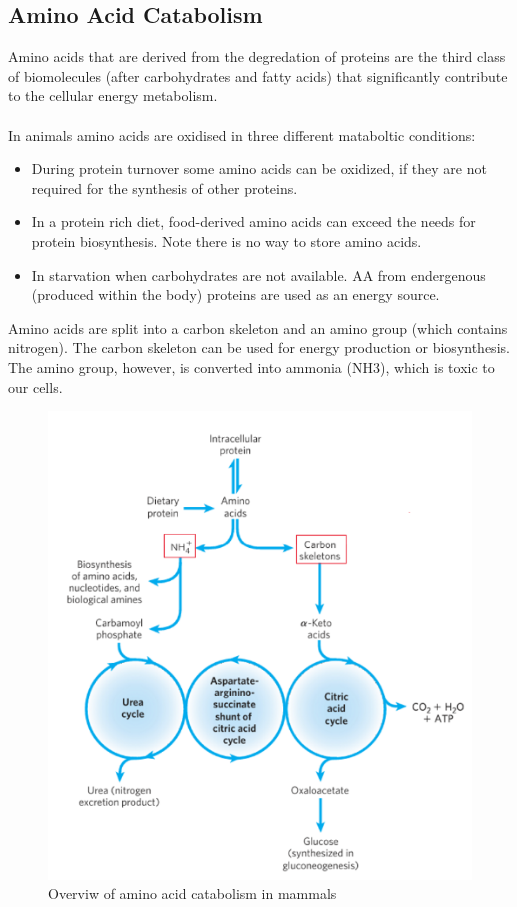\documentclass[../main.tex]{subfiles}
\begin{document}
\subsection{Amino Acid Catabolism}
Amino acids that are derived from the degredation of proteins are the third class of biomolecules (after carbohydrates and fatty acids) that significantly contribute to the cellular energy metabolism. \\
\\
In animals amino acids are oxidised in three different mataboltic conditions: 
\begin{itemize}
	\item During protein turnover some amino acids can be oxidized, if they are not required for the synthesis of other proteins. 
	\item In a protein rich diet, food-derived amino acids can exceed the needs for protein biosynthesis. Note there is no way to store amino acids.
	\item In starvation when carbohydrates are not available. AA from endergenous (produced within the body) proteins are used as an energy source.   
\end{itemize}
Amino acids are split into a carbon skeleton and an amino group (which contains nitrogen). The carbon skeleton can be used for energy production or biosynthesis. The amino group, however, is converted into ammonia (NH3), which is toxic to our cells.
\begin{figure}[H]
	\centering
	\includegraphics[width = 0.7 \textwidth]{AA1_1}
	\caption{Overviw of amino acid catabolism in mammals}
\end{figure}
\end{document}
